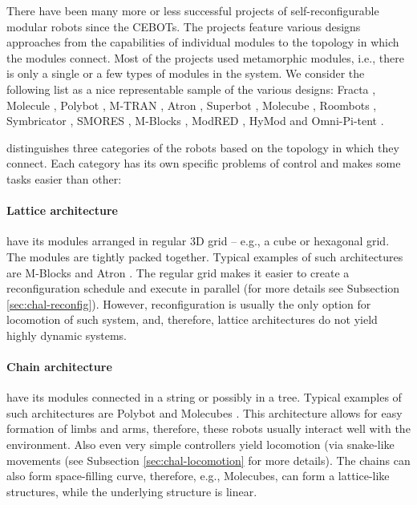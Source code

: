 There have been many more or less successful projects of self-reconfigurable
modular robots since the CEBOTs. The projects feature various designs approaches
from the capabilities of individual modules to the topology in which the modules
connect. Most of the projects used metamorphic modules, i.e., there is only a
single or a few types of modules in the system. We consider the following list
as a nice representable sample of the various designs: Fracta
\cite{DBLP:conf/icra/MurataKK94}, Molecule \cite{DBLP:conf/icra/KotayRVM98},
Polybot \cite{DBLP:conf/icra/YimDR00}, M-TRAN
\cite{DBLP:conf/icarcv/KurokawaKYTMK02}, Atron
\cite{DBLP:conf/iros/JorgensenOL04}, Superbot \cite{DBLP:conf/iros/SalemiMS06},
Molecube \cite{DBLP:journals/trob/ZykovMDL07}, Roombots
\cite{DBLP:conf/icra/SprowitzBDI09}, Symbricator
\cite{DBLP:journals/corr/abs-1109-2288}, SMORES \cite{DBLP:conf/iros/DaveyKY12},
M-Blocks \cite{DBLP:conf/iros/RomanishinGR13}, ModRED
\cite{DBLP:journals/ras/BacaHDND14}, HyMod \cite{DBLP:conf/dars/ParrottDG16} and
Omni-Pi-tent \cite{DBLP:conf/taros/PeckTT19}.

\textcite{4141032} distinguishes three categories of the robots based on the
topology in which they connect. Each category has its own specific problems of
control and makes some tasks easier than other:

\paragraph{Lattice architecture} have its modules arranged in regular 3D grid --
e.g., a cube or hexagonal grid. The modules are tightly packed together. Typical
examples of such architectures are M-Blocks \cite{DBLP:conf/iros/RomanishinGR13}
and Atron \cite{DBLP:conf/iros/JorgensenOL04}. The regular grid makes it easier
to create a reconfiguration schedule and execute in parallel (for more details
see Subsection \ref{sec:chal-reconfig}). However, reconfiguration is usually the
only option for locomotion of such system, and, therefore, lattice architectures
do not yield highly dynamic systems.

\paragraph{Chain architecture} have its modules connected in a string or
possibly in a tree. Typical examples of such architectures are Polybot
\cite{DBLP:conf/icra/YimDR00} and Molecubes
\cite{DBLP:journals/trob/ZykovMDL07}. This architecture allows for easy
formation of limbs and arms, therefore, these robots usually interact well with
the environment. Also even very simple controllers yield locomotion (via
snake-like movements (see Subsection \ref{sec:chal-locomotion} for more
details). The chains can also form space-filling curve, therefore, e.g.,
Molecubes, can form a lattice-like structures, while the underlying structure is
linear.

